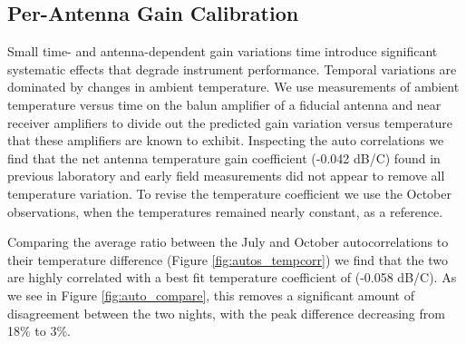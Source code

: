 \documentclass[preprint]{aastex}
\begin{document}
\subsection{Per-Antenna Gain Calibration}


Small time- and antenna-dependent gain variations time introduce significant systematic effects that degrade 
instrument performance. Temporal variations are dominated by changes in ambient temperature. 
We use measurements of ambient temperature versus time on the balun amplifier of a fiducial antenna and near
receiver amplifiers to divide out the predicted gain variation versus temperature that these amplifiers
are known to exhibit.  Inspecting the auto correlations we find that the net antenna temperature gain coefficient (-0.042 dB/C) found in previous laboratory \citep{Parashare:2011p9872} and early field 
measurements  \citep{Pober:2012p8800} did not appear to remove all temperature variation.  To
revise the temperature coefficient we use the October observations, when the temperatures remained nearly constant, as a reference.


Comparing the average ratio between the July and October autocorrelations to their temperature difference (Figure \ref{fig:autos_tempcorr}) we find that the two are highly correlated  with 
a best fit temperature coefficient of (-0.058 dB/C). As we see in Figure \ref{fig:auto_compare}, this removes a significant amount of disagreement between the two nights, 
with the peak difference decreasing from 18\% to 3\%.
\end{document}
